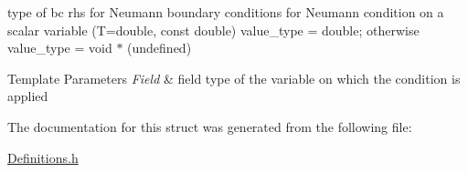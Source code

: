 type of bc rhs for Neumann boundary conditions for Neumann condition on a scalar variable (T=double, const double) value\+\_\+type = double; otherwise value\+\_\+type = void $\ast$ (undefined) 


\begin{DoxyTemplParams}{Template Parameters}
{\em Field} & field type of the variable on which the condition is applied \\
\hline
\end{DoxyTemplParams}


The documentation for this struct was generated from the following file\+:\begin{DoxyCompactItemize}
\item 
\hyperlink{Definitions_8h}{Definitions.\+h}\end{DoxyCompactItemize}
